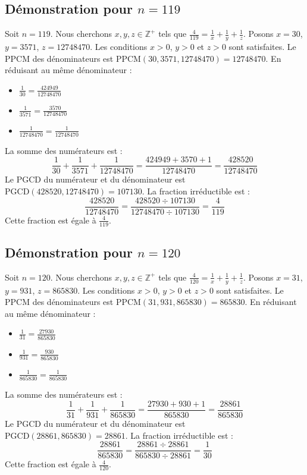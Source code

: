 \documentclass[11pt,a4paper]{article}
\begin{document}
\subsection{Démonstration pour $n = 119$}
Soit $n = 119$. Nous cherchons $x, y, z \in \mathbb{Z}^{+}$ tels que $\frac{4}{119} = \frac{1}{x} + \frac{1}{y} + \frac{1}{z}$.
Posons $x = 30$, $y = 3571$, $z = 12748470$.
Les conditions $x > 0$, $y > 0$ et $z > 0$ sont satisfaites.
Le PPCM des dénominateurs est $\text{PPCM}(30, 3571, 12748470) = 12748470$.
En réduisant au même dénominateur :
\begin{itemize}
    \item $\frac{1}{30} = \frac{424949}{12748470}$
    \item $\frac{1}{3571} = \frac{3570}{12748470}$
    \item $\frac{1}{12748470} = \frac{1}{12748470}$
\end{itemize}
La somme des numérateurs est :
$$ \frac{1}{30} + \frac{1}{3571} + \frac{1}{12748470} = \frac{424949 + 3570 + 1}{12748470} = \frac{428520}{12748470} $$
Le PGCD du numérateur et du dénominateur est $\text{PGCD}(428520, 12748470) = 107130$.
La fraction irréductible est :
$$ \frac{428520}{12748470} = \frac{428520 \div 107130}{12748470 \div 107130} = \frac{4}{119} $$
Cette fraction est égale à $\frac{4}{119}$.

\subsection{Démonstration pour $n = 120$}
Soit $n = 120$. Nous cherchons $x, y, z \in \mathbb{Z}^{+}$ tels que $\frac{4}{120} = \frac{1}{x} + \frac{1}{y} + \frac{1}{z}$.
Posons $x = 31$, $y = 931$, $z = 865830$.
Les conditions $x > 0$, $y > 0$ et $z > 0$ sont satisfaites.
Le PPCM des dénominateurs est $\text{PPCM}(31, 931, 865830) = 865830$.
En réduisant au même dénominateur :
\begin{itemize}
    \item $\frac{1}{31} = \frac{27930}{865830}$
    \item $\frac{1}{931} = \frac{930}{865830}$
    \item $\frac{1}{865830} = \frac{1}{865830}$
\end{itemize}
La somme des numérateurs est :
$$ \frac{1}{31} + \frac{1}{931} + \frac{1}{865830} = \frac{27930 + 930 + 1}{865830} = \frac{28861}{865830} $$
Le PGCD du numérateur et du dénominateur est $\text{PGCD}(28861, 865830) = 28861$.
La fraction irréductible est :
$$ \frac{28861}{865830} = \frac{28861 \div 28861}{865830 \div 28861} = \frac{1}{30} $$
Cette fraction est égale à $\frac{4}{120}$.
\end{document}
